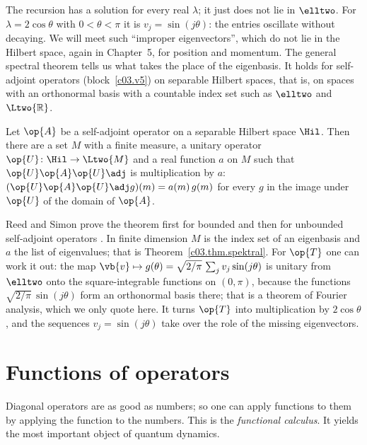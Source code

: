 \begin{vertiefung}
  The recursion has a solution for every real $\lambda$; it just does not lie in $\elltwo$.
  For $\lambda = 2\cos\theta$ with $0 < \theta < \pi$ it is $v_j = \sin(j\theta)$: the entries
  oscillate without decaying. We will meet such ``improper eigenvectors'', which do not lie in the
  Hilbert space, again in Chapter~5, for position and momentum. The general spectral theorem tells
  us what takes the place of the eigenbasis. It holds for self-adjoint operators
  (block~\ref{c03.v5}) on separable Hilbert spaces, that is, on spaces with an orthonormal basis
  with a countable index set such as $\elltwo$ and $\Ltwo{\mathbb{R}}$.

  \begin{theorem}\label{c03.thm.spektral-allgemein}
    Let $\op{A}$ be a self-adjoint operator on a separable Hilbert space $\Hil$. Then there are a
    set $M$ with a finite measure, a unitary operator $\op{U}\colon \Hil \to \Ltwo{M}$ and a real
    function $a$ on $M$ such that $\op{U}\op{A}\op{U}\adj$ is multiplication by $a$:
    $(\op{U}\op{A}\op{U}\adj g)(m) = a(m)\, g(m)$ for every $g$ in the image under $\op{U}$ of
    the domain of $\op{A}$.
  \end{theorem}

  Reed and Simon prove the theorem first for bounded and then for unbounded self-adjoint
  operators . In finite dimension $M$ is the index set
  of an eigenbasis and $a$ the list of eigenvalues; that is Theorem~\ref{c03.thm.spektral}. For
  $\op{T}$ one can work it out: the map
  $\vb{v} \mapsto g(\theta) = \sqrt{2/\pi}\, \sum_j v_j \sin(j\theta)$ is unitary from $\elltwo$
  onto the square-integrable functions on $(0, \pi)$, because the functions
  $\sqrt{2/\pi}\,\sin(j\theta)$ form an orthonormal basis there; that is a theorem of Fourier
  analysis, which we only quote here. It turns $\op{T}$ into multiplication by $2\cos\theta$, and
  the sequences $v_j = \sin(j\theta)$ take over the role of the missing eigenvectors.
\end{vertiefung}

\section{Functions of operators}\label{c03.s15}

Diagonal operators are as good as numbers; so one can apply functions to them by applying the
function to the numbers. This is the \emph{functional calculus}. It yields the most important
object of quantum dynamics.

